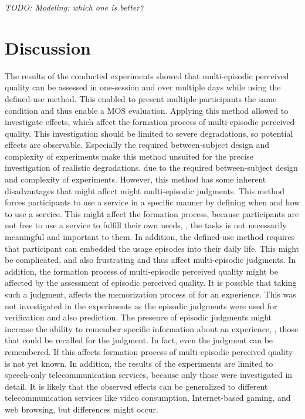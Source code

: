 \emph{TODO: Modeling: which one is better?}

\section{Discussion}
The results of the conducted experiments showed that multi-episodic perceived quality can be assessed in one-session and over multiple days while using the defined-use method.
This enabled to present multiple participants the same condition and thus enable a \ac{MOS} evaluation.
Applying this method allowed to investigate effects, which affect the formation process of multi-episodic perceived quality.
This investigation should be limited to severe degradations, so potential effects are observable.
Especially the required between-subject design and complexity of experiments make this method unsuited for the precise investigation of realistic degradations.
due to the required between-subject design and complexity of experiments.
However, this method has some inherent disadvantages that might affect might multi-episodic judgments.
This method forces participants to use a service in a specific manner by defining when and how to use a service.
This might affect the formation process, because participants are not free to use a service to fulfill their own needs, \ie, the tasks is not necessarily meaningful and important to them.
In addition, the defined-use method requires that participant can embedded the usage episodes into their daily life.
This might be complicated, and also frustrating and thus affect multi-episodic judgments.
In addition, the formation process of multi-episodic perceived quality might be affected by the assessment of episodic perceived quality.
It is possible that taking such a judgment, affects the memorization process of for an experience.
This was not investigated in the experiments as the episodic judgments were used for verification and also prediction.
The presence of episodic judgments might increase the ability to remember specific information about an experience, \ie, those that could be recalled for the judgment.
In fact, even the judgment can be remembered.
If this affects formation process of multi-episodic perceived quality is not yet known.
In addition, the results of the experiments are limited to speech-only telecommunication services, because only those were investigated in detail.
It is likely that the observed effects can be generalized to different telecommunication services like video consumption, Internet-based gaming, and web browsing, but differences might occur.

